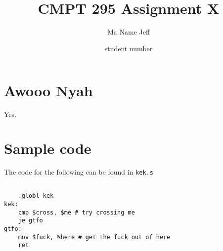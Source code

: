 \documentclass{article}
\title{CMPT 295 Assignment X}
\author{Ma Name Jeff}
\date{student number}
\begin{document}
\maketitle

\section{Awooo Nyah}
Yes.

\section{Sample code}
The code for the following can be found in \texttt{kek.s}
\begin{lstlisting}

	.globl kek
kek:
	cmp $cross, $me # try crossing me
	je gtfo
gtfo:
	mov $fuck, %here # get the fuck out of here
	ret

\end{lstlisting}
\end{document}
